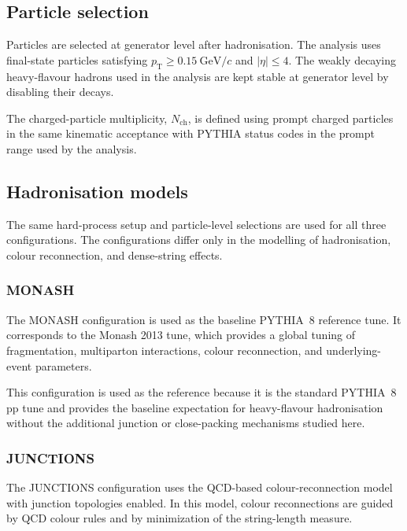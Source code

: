 \subsection{Particle selection}
\label{sec:particle-selection}

Particles are selected at generator level after hadronisation.  The analysis uses final-state particles satisfying $p_{\mathrm{T}} \geq 0.15~\mathrm{GeV}/c$ and $|\eta| \leq 4$. The weakly decaying heavy-flavour hadrons used in the analysis are kept stable at generator level by disabling their decays.

The charged-particle multiplicity, $N_{\mathrm{ch}}$, is defined using prompt charged particles in the same kinematic acceptance with PYTHIA status codes in the prompt range used by the analysis.

\subsection{Hadronisation models}
\label{sec:hadronisation-models}

The same hard-process setup and particle-level selections are used for all three configurations.  The configurations differ only in the modelling of hadronisation, colour reconnection, and dense-string effects.

\subsubsection{MONASH}
\label{sec:monash}

The MONASH configuration is used as the baseline PYTHIA~8 reference tune.  It corresponds to the Monash 2013 tune, which provides a global tuning of fragmentation, multiparton interactions, colour reconnection, and underlying-event parameters.

This configuration is used as the reference because it is the standard PYTHIA~8 pp tune and provides the baseline expectation for heavy-flavour hadronisation without the additional junction or close-packing mechanisms studied here.

\subsubsection{JUNCTIONS}
\label{sec:junctions}

The JUNCTIONS configuration uses the QCD-based colour-reconnection model with junction topologies enabled.  In this model, colour reconnections are guided by QCD colour rules and by minimization of the string-length measure. 

